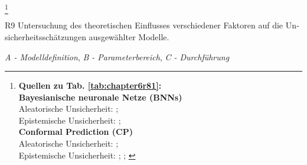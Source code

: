 \begin{otherlanguage}{ngerman}
\footnote{%
\begin{minipage}[t]{\textwidth}
\scriptsize
\textbf{Quellen zu Tab. \ref{tab:chapter6r81}:}\\[0.5em]
\textbf{Bayesianische neuronale Netze (BNNs)}\\
Aleatorische Unsicherheit: \parencite[Kap.~3]{blundell2015weight}; \parencite[S.~40–42]{gal2016uncertainty} \\
Epistemische Unsicherheit: \parencite[S.~40–42]{gal2016uncertainty}; \parencite{mackay1992practical} \\[0.5em]

\textbf{Conformal Prediction (CP)}\\
Aleatorische Unsicherheit: \parencite[S.~4–5]{vovk2005algorithmic}; \parencite{angelopoulos2021gentle} \\
Epistemische Unsicherheit: \parencite{angelopoulos2021gentle}; \parencite[S.~63–65]{shafer2008tutorial}; \parencite{rasmussen2006gaussian}
\end{minipage}%
}


\pagebreak


R9 Untersuchung des theoretischen Einflusses verschiedener Faktoren auf die Unsicherheitsschätzungen ausgewählter Modelle.



\textit{A - Modelldefinition}, \textit{B - Parameterbereich}, \textit{C - Durchführung}


\end{otherlanguage}
